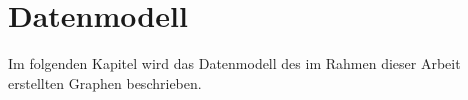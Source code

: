 \chapter{Datenmodell}

Im folgenden Kapitel wird das Datenmodell des im Rahmen dieser Arbeit erstellten Graphen beschrieben.